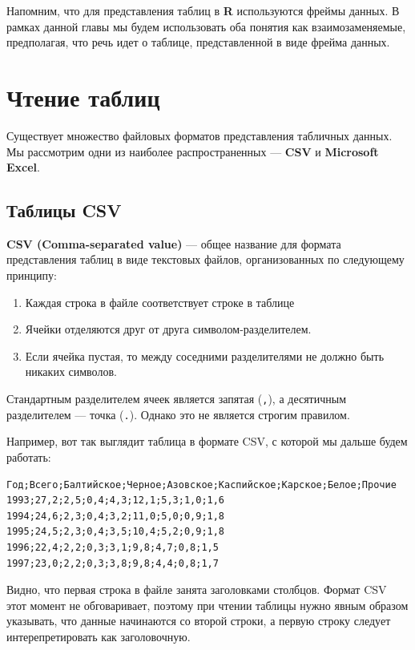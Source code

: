 \documentclass[]{book}
\providecommand{\tightlist}{%
  \setlength{\itemsep}{0pt}\setlength{\parskip}{0pt}}
\begin{document}
Напомним, что для представления таблиц в \textbf{R} используются фреймы
данных. В рамках данной главы мы будем использовать оба понятия как
взаимозаменяемые, предполагая, что речь идет о таблице, представленной в
виде фрейма данных.

\section{Чтение таблиц}\label{reading_tables}

Существует множество файловых форматов представления табличных данных.
Мы рассмотрим одни из наиболее распространенных --- \textbf{CSV} и
\textbf{Microsoft Excel}.

\subsection{Таблицы CSV}\label{reading_csv}

\textbf{CSV (Comma-separated value)} --- общее название для формата
представления таблиц в виде текстовых файлов, организованных по
следующему принципу:

\begin{enumerate}
\def\labelenumi{\arabic{enumi}.}
\tightlist
\item
  Каждая строка в файле соответствует строке в таблице
\item
  Ячейки отделяются друг от друга символом-разделителем.
\item
  Если ячейка пустая, то между соседними разделителями не должно быть
  никаких символов.
\end{enumerate}

Стандартным разделителем ячеек является запятая (\texttt{,}), а
десятичным разделителем --- точка (\texttt{.}). Однако это не является
строгим правилом.

Например, вот так выглядит таблица в формате CSV, с которой мы дальше
будем работать:

\begin{verbatim}
Год;Всего;Балтийское;Черное;Азовское;Каспийское;Карское;Белое;Прочие
1993;27,2;2,5;0,4;4,3;12,1;5,3;1,0;1,6
1994;24,6;2,3;0,4;3,2;11,0;5,0;0,9;1,8
1995;24,5;2,3;0,4;3,5;10,4;5,2;0,9;1,8
1996;22,4;2,2;0,3;3,1;9,8;4,7;0,8;1,5
1997;23,0;2,2;0,3;3,8;9,8;4,4;0,8;1,7
\end{verbatim}

Видно, что первая строка в файле занята заголовками столбцов. Формат CSV
этот момент не обговаривает, поэтому при чтении таблицы нужно явным
образом указывать, что данные начинаются со второй строки, а первую
строку следует интерепретировать как заголовочную.
\end{document}
